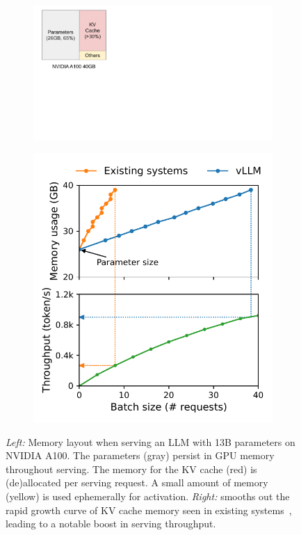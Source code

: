 \begin{figure}
    \centering
    \begin{subfigure}[c]{0.40\columnwidth}
    \centering
    \includegraphics[width=\columnwidth]{figures/memory-distribution.pdf}  
    \end{subfigure}
    \hfil
    \begin{subfigure}[c]{0.50\columnwidth}
    \centering
    \includegraphics[width=\columnwidth]{figures/memory_batchsize.pdf}
    \end{subfigure}
    \vspace{-10pt}
    \caption{\emph{Left:} Memory layout when serving an LLM with 13B parameters on NVIDIA A100. The parameters (gray) persist in GPU memory throughout serving. The memory for the KV cache (red) is (de)allocated per serving request. A small amount of memory (yellow) is used ephemerally for activation. 
    \emph{Right:}
    \sys smooths out the rapid growth curve of KV cache memory seen in existing systems~\cite{nvidiaft,yu2022orca}, leading to a notable boost in serving throughput.}
    \label{fig:motivation}
\end{figure}

